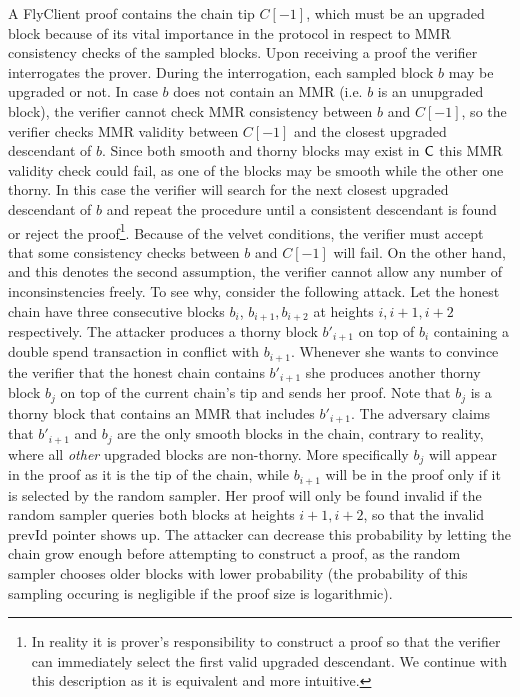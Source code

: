 	A FlyClient proof contains the chain tip $C[-1]$, which must be an upgraded block because of its vital importance in the protocol in respect to MMR consistency checks of the sampled blocks. 
	Upon receiving a proof the verifier interrogates the prover. During the interrogation, each sampled block $b$ may
	be upgraded or not. In case $b$ does not contain an MMR (i.e. $b$ is an unupgraded block), the verifier cannot check MMR consistency
	between $b$ and $C[-1]$, so the verifier checks MMR validity between $C[-1]$ and the closest upgraded descendant of $b$.
	Since both smooth and thorny blocks may exist in $\mathsf{C}$ this MMR validity check could fail, as one of the blocks may be smooth while the other one thorny.
	In this case the verifier will search for the next closest upgraded descendant of $b$ and repeat the procedure until a consistent descendant is found or reject 
	the proof\footnote{
	In reality it is prover's responsibility to construct a proof so that the verifier can immediately select the first valid upgraded descendant. We continue 
	with this description as it is equivalent and more intuitive.
	}.
	Because of the velvet conditions, the verifier must accept that some consistency checks between $b$ and $C[-1]$ will fail.
	On the other hand, and this denotes the second assumption, the verifier cannot allow any number of inconsinstencies freely. To see why,
	consider the following attack. Let the honest chain have three consecutive blocks $b_i$, $b_{i+1}, b_{i+2}$ at heights $i, i+1, i+2$ respectively. The attacker 
	produces a thorny block $b'_{i+1}$ on top of $b_i$ containing a double spend transaction in conflict with $b_{i+1}$.
	Whenever she wants to convince the verifier that the honest chain contains $b'_{i+1}$ she produces another thorny block $b_j$ on top of the current chain's tip 
	and sends her proof. Note that $b_j$ is a thorny block that contains an MMR that includes
	$b'_{i+1}$. The adversary claims that $b'_{i+1}$ and $b_j$ are the only smooth blocks in the chain, contrary to reality, where all \emph{other} upgraded blocks 
	are non-thorny.
	More specifically $b_j$ will appear in the proof as it is the tip of the chain, while $b_{i+1}$ will be in the proof
	only if it is selected by the random sampler. Her proof will only be found invalid if the random sampler queries both blocks at heights $i+1, i+2$, so that 
	the invalid prevId pointer shows up. The attacker can decrease this probability
	by letting the chain grow enough before attempting to construct a proof, as the random sampler chooses older blocks with lower probability 
	(the probability of this sampling occuring is negligible if the proof size is logarithmic). 
